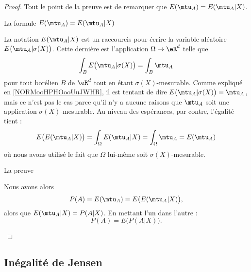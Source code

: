 \begin{proof}
    Tout le point de la preuve est de remarquer que \( E(\mtu_A)=E(\mtu_A|X)\). 
    
    \begin{subproof}
    \item[La formule \( E(\mtu_A)=E(\mtu_A|X)\)]
    
     La notation \( E(\mtu_A|X)\) est un raccourcis pour écrire la variable aléatoire \( E\big(\mtu_A|\sigma(X)\big)\). Cette dernière est l'application \( \Omega\to \eR^d\) telle que
    \begin{equation}
        \int_B E\big( \mtu_A|\sigma(X) \big)=\int_B\mtu_A
    \end{equation}
    pour tout borélien \( B\) de \( \eR^d\) tout en étant \( \sigma(X)\)-mesurable. Comme expliqué en \ref{NORMooHPHOooUuJWHR}, il est tentant de dire \( E\big( \mtu_A|\sigma(X) \big)=\mtu_A\), mais ce n'est pas le cas parce qu'il n'y a aucune raisons que \( \mtu_A\) soit une application \( \sigma(X)\)-mesurable. Au niveau des espérances, par contre, l'égalité tient :
    \begin{equation}
            E\big( E(\mtu_A|X) \big)=\int_{\Omega}E(\mtu_A|X)=\int_{\Omega}\mtu_A=E(\mtu_A)
    \end{equation}
    où nous avons utilisé le fait que \( \Omega\) lui-même soit \( \sigma(X)\)-mesurable.

        \item[La preuve]

            Nous avons alors
            \begin{equation}
                P(A)=E(\mtu_A)=E\big( E(\mtu_A|X) \big),
            \end{equation}
            alors que \( E(\mtu_A|X)=P(A|X)\). En mettant l'un dans l'autre :
            \begin{equation}
                P(A)=E\big( P(A|X) \big).
            \end{equation}
    \end{subproof}
\end{proof}

\subsection{Inégalité de Jensen}

